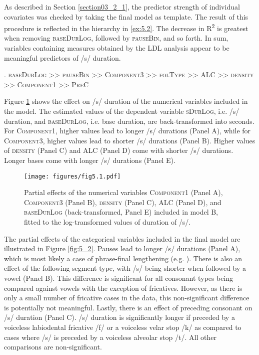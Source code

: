 As described in Section \ref{section03_2_1}, the predictor strength of individual covariates was checked by taking the final model as template. The result of this procedure is reflected in the hierarchy in \ref{ex:5.2}. The decrease in R\textsuperscript{2} is greatest when removing \textsc{baseDurLog}, followed by \textsc{pauseBin}, and so forth. In sum, variables containing measures obtained by the LDL analysis appear to be meaningful predictors of /s/ duration.

\ex.
\label{ex:5.2}
\textsc{baseDurLog >> pauseBin >> Component3 >> folType >> ALC >> density >> Component1 >> PreC}

Figure \ref{fig:5_1} shows the effect on /s/ duration of the numerical variables included in the model. The estimated values of the dependent variable \textsc{sDurLog}, i.e. /s/ duration, and \textsc{baseDurLog}, i.e. base duration, are back-transformed into seconds. For \textsc{Component1}, higher values lead to longer /s/ durations (Panel A), while for \textsc{Component3}, higher values lead to shorter /s/ durations (Panel B). Higher values of \textsc{density} (Panel C) and \textsc{ALC} (Panel D) come with shorter /s/ durations. Longer bases come with longer /s/ durations (Panel E).

\begin{figure}
    \centering
    \texttt{[image: figures/fig5.1.pdf]}
    \caption{Partial effects of the numerical variables \textsc{Component1} (Panel A), \textsc{Component3} (Panel B), \textsc{density} (Panel C), \textsc{ALC} (Panel D), and \textsc{baseDurLog} (back-transformed, Panel E) included in model B, fitted to the log-transformed values of duration of /s/.}
    \label{fig:5_1}
\end{figure}

The partial effects of the categorical variables included in the final model are illustrated in Figure \ref{fig:5_2}. Pauses lead to longer /s/ durations (Panel A), which is most likely a case of phrase-final lengthening (e.g. \cite{Cooper1981}). There is also an effect of the following segment type, with /s/ being shorter when followed by a vowel (Panel B). This difference is significant for all consonant types being compared against vowels with the exception of fricatives. However, as there is only a small number of fricative cases in the data, this non-significant difference is potentially not meaningful. Lastly, there is an effect of preceding consonant on /s/ duration (Panel C). /s/ duration is significantly longer if preceded by a voiceless labiodental fricative /f/ or a voiceless velar stop /k/ as compared to cases where /s/ is preceded by a voiceless alveolar stop /t/. All other comparisons are non-significant.

